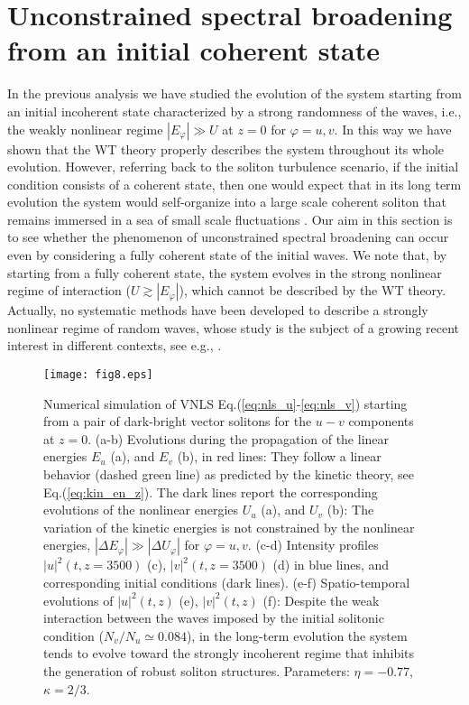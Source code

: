 \documentclass[pra,twocolumn,showpacs,preprintnumbers,amsmath,amssymb]{revtex4}
\def\vfi{\varphi}
\begin{document}
\section{Unconstrained spectral broadening from an initial coherent  state}
\label{sec:soliton}

In the previous analysis we have studied the evolution of the system starting from an initial incoherent state characterized by a strong randomness of the waves, i.e., the weakly nonlinear regime $|E_\varphi| \gg U$ at $z=0$ for $\varphi=u,v$.
In this way we have shown that the WT theory properly describes the system throughout its whole evolution.
However, referring back to the soliton turbulence scenario, if the initial condition consists of a coherent state, then one would expect that in its long term evolution the system would self-organize into a large scale coherent soliton that remains immersed in a sea of small scale fluctuations \cite{jordan,rumpf01,ZakhPhysRep01,PLA10}.
Our aim in this section is to see whether the phenomenon of unconstrained spectral broadening can occur even by considering a fully coherent state of the initial waves.
We note that, by starting from a fully coherent state, the system evolves in the strong nonlinear regime of interaction ($U \gtrsim |E_\vfi|$), which cannot be described by the WT theory. Actually, no systematic methods have been developed to describe a strongly nonlinear regime of random waves, whose study is the subject of a growing recent interest in different contexts, see e.g.,  \cite{ZakhPhysRep01,nazarenkoPR,derevyanko12,
nazarenko,rumpfPRL09,PR14,turitsyn13,Lvov_acoustic,
rumpfPRL12,NC15,Silberberg09,PRL04,Josserand13,
vorticesBEC,rumpf15,delre16}.


\begin{center}
\begin{figure}[t]
\texttt{[image: fig8.eps]}
\caption{Numerical simulation of VNLS Eq.(\ref{eq:nls_u}-\ref{eq:nls_v}) starting from a pair of dark-bright vector solitons for the $u-v$ components at $z=0$.
(a-b) Evolutions during the propagation of the linear energies $E_u$ (a), and $E_v$ (b), in red lines: They follow a linear behavior (dashed green line) as predicted by the kinetic theory, see Eq.(\ref{eq:kin_en_z}).
The dark lines report the corresponding evolutions of the nonlinear energies $U_u$ (a), and $U_v$ (b):
The variation of the kinetic energies is not constrained by the nonlinear energies, $|\Delta E_{\vfi}| \gg |\Delta U_{\vfi}|$ for $\vfi=u,v$.
(c-d) Intensity profiles $|u|^2(t,z=3500)$ (c), $|v|^2(t,z=3500)$ (d) in blue lines, and corresponding initial conditions (dark lines).
(e-f) Spatio-temporal evolutions of $|u|^2(t,z)$ (e), $|v|^2(t,z)$ (f): Despite the weak interaction between the waves imposed by the initial solitonic condition ($N_v/N_u \simeq 0.084$), in the long-term evolution the system tends to evolve toward the strongly incoherent regime that inhibits the generation of robust soliton structures. Parameters: $\eta=-0.77$, $\kappa=2/3$.}
\label{fig:soliton_break}
\end{figure}
\end{center}
\end{document}

